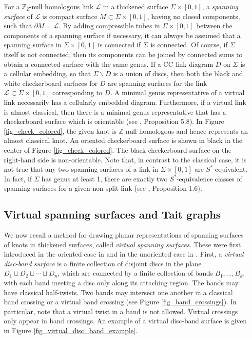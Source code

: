 \documentclass[11pt, twoside]{amsart}
\numberwithin{equation}{section}
\theoremstyle{definition}
\numberwithin{equation}{section}
\begin{document}
For a $\mathbb{Z}_2$-null homologous link $\mathcal{L}$ in a thickened surface $\Sigma \times [0,1]$, a \emph{spanning surface} of $\mathcal{L}$ is compact surface $M \subset \Sigma \times [0,1]$, having no closed components, such that $\partial M=\mathcal{L}$. By adding compressible tubes in $\Sigma \times [0,1]$ between the components of a spanning surface if necessary, it can always be assumed that a spanning surface in $\Sigma \times [0,1]$ is connected if $\Sigma$ is connected. Of course, if $\Sigma$ itself is not connected, then its components can be joined by connected sums to obtain a connected surface with the same genus. If a CC link diagram $D$ on $\Sigma$ is a cellular embedding, so that $\Sigma \smallsetminus D$ is a union of discs, then both the black and white checkerboard surfaces for $D$ are spanning surfaces for the link $\mathcal{L} \subset \Sigma \times [0,1]$ corresponding to $D$. A minimal genus representative of a virtual link necessarily has a cellularly embedded diagram. Furthermore, if a virtual link is almost classical, then there is a minimal genus representative that has a checkerboard surface which is orientable (see \cite{boden_chrisman_karimi}, Proposition 5.8). In Figure \ref{fig_check_colored}, the given knot is $\mathbb{Z}$-null homologous and hence represents an almost classical knot. An oriented checkerboard surface is shown in black in the center of Figure \ref{fig_check_colored}. The black checkerboard surface on the right-hand side is non-orientable. Note that, in contrast to the classical case, it is not true that any two spanning surfaces of a link in $\Sigma \times [0,1]$ are $S^*$-equivalent. In fact, if $\Sigma$ has genus at least 1, there are exactly two $S^*$-equivalence classes of spanning surfaces for a given non-split link (see \cite{boden_chrisman_karimi}, Proposition 1.6). 

\subsection{Virtual spanning surfaces and Tait graphs} \label{sec_virt_tait_graphs} We now recall a method for drawing planar representations of spanning surfaces of knots in thickened surfaces, called \emph{virtual spanning surfaces}. These were first introduced in the oriented case in \cite{chrisman_vss,boden_chrisman_gaudreau} and in the unoriented case in \cite{boden_chrisman_karimi}. First, a \emph{virtual disc-band surface} is a finite collection of disjoint discs in the plane $D_1 \sqcup D_2 \sqcup \cdots \sqcup D_n$, which are connected by a finite collection of bands $B_1,\ldots,B_k$, with each band meeting a disc only along its attaching region. The bands may have classical half-twists. Two bands may intersect one another in a classical band crossing or a virtual band crossing (see Figure \ref{fig_band_crossings}). In particular, note that a virtual twist in a band is not allowed. Virtual crossings only appear in band crossings. An example of a virtual disc-band surface is given in Figure \ref{fig_virtual_disc_band_example}. 
\end{document}
